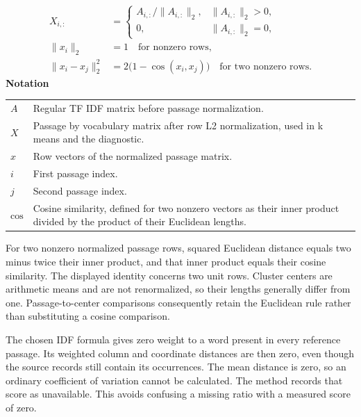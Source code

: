\documentclass[10pt,letterpaper]{article}
\newcommand{\notlabel}{\noindent\textbf{Notation}\par\nobreak\vspace{4pt}}
\begin{document}
\par\noindent\begin{minipage}{\linewidth}
\begin{equation}\label{eq:rowl2}
\begin{aligned}X_{i,:}&=\begin{cases}A_{i,:}/\lVert A_{i,:}\rVert_2,&\lVert A_{i,:}\rVert_2>0,\\0,&\lVert A_{i,:}\rVert_2=0,\end{cases}\\\lVert x_i\rVert_2&=1\quad\text{for nonzero rows},\\\lVert x_i-x_j\rVert_2^2&=2\bigl(1-\cos(x_i,x_j)\bigr)\quad\text{for two nonzero rows}.\end{aligned}
\end{equation}
\notlabel
{\fontsize{8.5}{10.5}\selectfont\setlength{\tabcolsep}{0pt}\renewcommand{\arraystretch}{1.12}
\begin{tabularx}{\linewidth}{@{}p{.14\linewidth}X@{}}
$A$ & Regular TF IDF matrix before passage normalization.\\
$X$ & Passage by vocabulary matrix after row L2 normalization, used in k means and the diagnostic.\\
$x$ & Row vectors of the normalized passage matrix.\\
$i$ & First passage index.\\
$j$ & Second passage index.\\
$\mathrm{cos}$ & Cosine similarity, defined for two nonzero vectors as their inner product divided by the product of their Euclidean lengths.\\
\end{tabularx}}
\par\vspace{2pt}
\end{minipage}\par
For two nonzero normalized passage rows, squared Euclidean distance equals two minus twice their inner product, and that inner product equals their cosine similarity. The displayed identity concerns two unit rows. Cluster centers are arithmetic means and are not renormalized, so their lengths generally differ from one. Passage-to-center comparisons consequently retain the Euclidean rule rather than substituting a cosine comparison.\par

The chosen IDF formula gives zero weight to a word present in every reference passage. Its weighted column and coordinate distances are then zero, even though the source records still contain its occurrences. The mean distance is zero, so an ordinary coefficient of variation cannot be calculated. The method records that score as unavailable. This avoids confusing a missing ratio with a measured score of zero.\par
\end{document}
